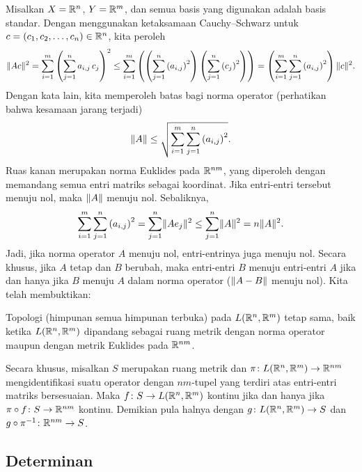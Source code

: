 Misalkan
$X={\mathbb{R}}^n$, $Y={\mathbb{R}}^m$, dan
semua basis yang digunakan adalah basis standar.
Dengan menggunakan ketaksamaan Cauchy--Schwarz untuk $c=(c_1,c_2,\ldots,c_n) \in {\mathbb{R}}^n$, kita peroleh
\begin{equation*}
\lVert {Ac} \rVert^2
=
\sum_{i=1}^m { \left(\sum_{j=1}^n a_{i,j} \, c_j \right)}^2
\leq
\sum_{i=1}^m
\left(
\left(\sum_{j=1}^n {(a_{i,j})}^2 \right)
\left(\sum_{j=1}^n {(c_j)}^2 \right)
\right)
=
\left(
\sum_{i=1}^m \sum_{j=1}^n {(a_{i,j})}^2 \right)
\lVert {c} \rVert^2 .
\end{equation*}
Dengan kata lain, kita memperoleh batas bagi norma operator (perhatikan bahwa kesamaan
jarang terjadi)
\begin{equation*}
\lVert {A} \rVert \leq
\sqrt{\sum_{i=1}^m \sum_{j=1}^n {(a_{i,j})}^2} .
\end{equation*}
Ruas kanan merupakan norma Euklides pada ${\mathbb{R}}^{nm}$, yang
diperoleh dengan memandang semua entri matriks sebagai koordinat.
Jika entri-entri tersebut menuju nol, maka $\lVert {A} \rVert$ menuju nol.
Sebaliknya,
\begin{equation*}
\sum_{i=1}^m \sum_{j=1}^n {(a_{i,j})}^2
=
\sum_{j=1}^n \lVert {A e_j} \rVert^2
\leq
\sum_{j=1}^n \lVert {A} \rVert^2
= n \lVert {A} \rVert^2 .
\end{equation*}
Jadi, jika norma operator $A$ menuju nol, entri-entrinya juga menuju nol.
Secara khusus, jika $A$ tetap dan $B$ berubah,
maka entri-entri $B$ menuju entri-entri $A$ jika dan hanya jika $B$ menuju $A$ dalam
norma operator ($\lVert {A-B} \rVert$ menuju nol).  Kita telah membuktikan:

\begin{prop} \label{prop:matrixcont}
Topologi (himpunan semua himpunan terbuka) pada $L({\mathbb{R}}^n,{\mathbb{R}}^m)$ tetap sama,
baik ketika $L({\mathbb{R}}^n,{\mathbb{R}}^m)$ dipandang sebagai ruang metrik dengan norma
operator maupun dengan metrik Euklides pada ${\mathbb{R}}^{nm}$.

Secara khusus, misalkan $S$ merupakan ruang metrik dan
$\pi \colon L({\mathbb{R}}^n,{\mathbb{R}}^m) \to {\mathbb{R}}^{nm}$ mengidentifikasi
suatu operator dengan $nm$-tupel yang terdiri atas entri-entri matriks bersesuaian.
Maka
$f \colon S \to L({\mathbb{R}}^n,{\mathbb{R}}^m)$
kontinu
jika dan hanya jika
$\pi \circ f \colon S \to {\mathbb{R}}^{nm}$
kontinu.
Demikian pula halnya dengan
$g \colon L({\mathbb{R}}^n,{\mathbb{R}}^m) \to S$ dan
$g \circ \pi^{-1} \colon {\mathbb{R}}^{nm} \to S$.
\end{prop}

\subsection{Determinan}

